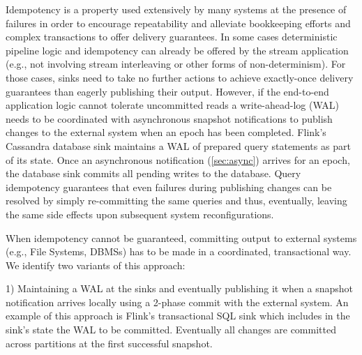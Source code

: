 Idempotency is a property used extensively by many systems at the presence of failures in order to encourage repeatability and alleviate bookkeeping efforts and complex transactions to offer delivery guarantees\cite{CUSTOM:web/SparkStructuredStreaming,millwheel}. In some cases deterministic pipeline logic and idempotency can already be offered by the stream application (e.g., not involving stream interleaving or other forms of non-determinism). For those cases, sinks need to take no further actions to achieve exactly-once delivery guarantees than eagerly publishing their output. However, if the end-to-end application logic cannot tolerate uncommitted reads a write-ahead-log (WAL) needs to be coordinated with asynchronous snapshot notifications to publish changes to the external system when an epoch has been completed. Flink's Cassandra database sink maintains a WAL of prepared query statements as part of its state. Once an asynchronous notification (\autoref{sec:async}) arrives for an epoch, the database sink commits all pending writes to the database. Query idempotency guarantees that even failures during publishing changes can be resolved by simply re-committing the same queries and thus, eventually, leaving the same side effects upon subsequent system reconfigurations. 


 When idempotency cannot be guaranteed, committing output to external systems (e.g., File Systems, DBMSs) has to be made in a coordinated, transactional way. We identify two variants of this approach:

1) Maintaining a WAL at the sinks and eventually publishing it when a snapshot notification arrives locally using a 2-phase commit with the external system. An example of this approach is Flink's transactional SQL sink which includes in the sink's state the WAL to be committed. Eventually all changes are committed across partitions at the first successful snapshot. 

